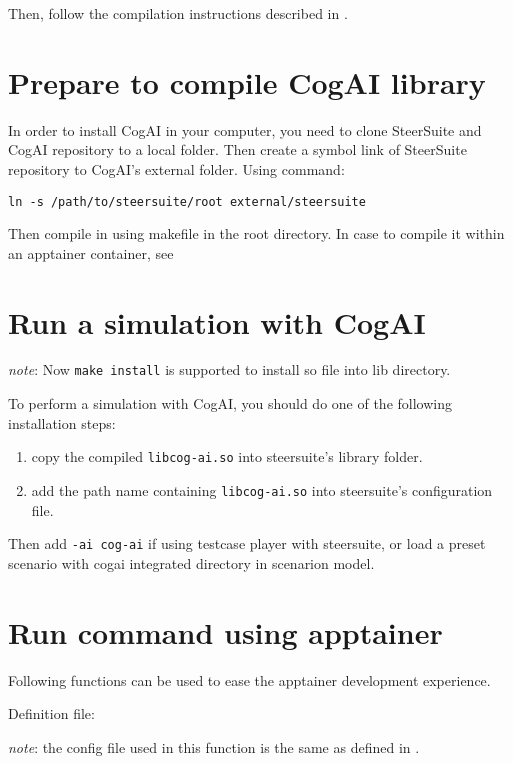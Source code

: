 Then, follow the compilation instructions described in .

\section{Prepare to compile CogAI library}

In order to install CogAI in your computer, you need to clone SteerSuite and CogAI repository to a local folder. Then 
create a symbol link of SteerSuite repository to CogAI's external folder. Using command:
\begin{verbatim}
ln -s /path/to/steersuite/root external/steersuite
\end{verbatim}

Then compile in using makefile in the root directory. In case to compile it within an apptainer container, see 

\section{Run a simulation with CogAI}

\textit{note}: Now \texttt{make install} is supported to install so file into lib directory.

To perform a simulation with CogAI, you should do one of the following installation steps:

\begin{enumerate}
  \item copy the compiled \texttt{libcog-ai.so} into steersuite's library folder.
  \item add the path name containing \texttt{libcog-ai.so} into steersuite's configuration file.
\end{enumerate}

Then add \texttt{-ai cog-ai} if using testcase player with steersuite, or load a preset scenario with cogai 
integrated directory in scenarion model.

\section{Run command using apptainer}
\label{sec:cogai-apptainer}
Following functions can be used to ease the apptainer development experience.

Definition file: 

\textit{note}: the config file used in this function is the same as defined in .

\printbibliography

